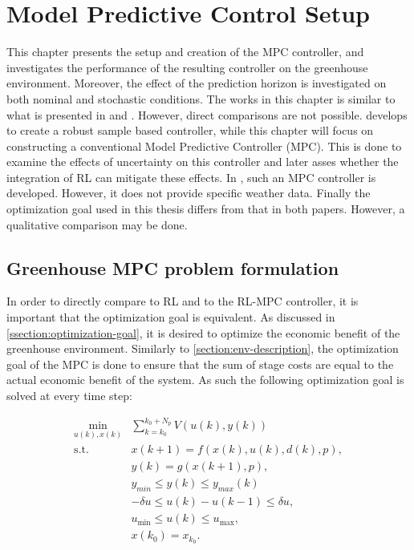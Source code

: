 \chapter{Model Predictive Control Setup}
\label{chapter:MPC}
This chapter presents the setup and creation of the MPC controller, and investigates the performance of the resulting controller on the greenhouse environment. Moreover, the effect of the prediction horizon is investigated on both nominal and stochastic conditions. The works in this chapter is similar to what is presented in \cite{boersmaRobustSamplebasedModel2022} and \cite{morcegoReinforcementLearningModel2023}. However, direct comparisons are not possible. \cite{boersmaRobustSamplebasedModel2022} develops to create a robust sample based controller, while this chapter will focus on constructing a conventional Model Predictive Controller (MPC). This is done to examine the effects of uncertainty on this controller and later asses whether the integration of RL can mitigate these effects. In \cite{morcegoReinforcementLearningModel2023}, such an MPC controller is developed. However, it does not provide specific weather data. Finally the optimization goal used in this thesis differs from that in both papers. However, a qualitative comparison may be done.




\section{Greenhouse MPC problem formulation}
In order to directly compare to RL and to the RL-MPC controller, it is important that the optimization goal is equivalent. As discussed in \autoref{ssection:optimization-goal}, it is desired to optimize the economic benefit of the greenhouse environment. Similarly to \autoref{section:env-description}, the optimization goal of the MPC is done to ensure that the sum of stage costs are equal to the actual economic benefit of the system. As such the following optimization goal is solved at every time step:

\begin{equation}\label{eq:mpc_ocp}
	\begin{aligned}
		\min_{u(k),x(k)} & \sum_{k = k_0}^{k_0 + N_p} V(u(k), y(k)) \\
		\text{s.t.} \quad & x(k+1) = f(x(k), u(k), d(k), p), \\
		& y(k) = g(x(k+1), p), \\
		& y_{min} \leq y(k) \leq y_{max}(k) \\
		& -\delta u \leq u(k) - u(k-1) \leq \delta u, \\
		& u_{\min} \leq u(k) \leq u_{\max}, \\
		& x(k_0) = x_{k_0}.
	\end{aligned}
\end{equation}

